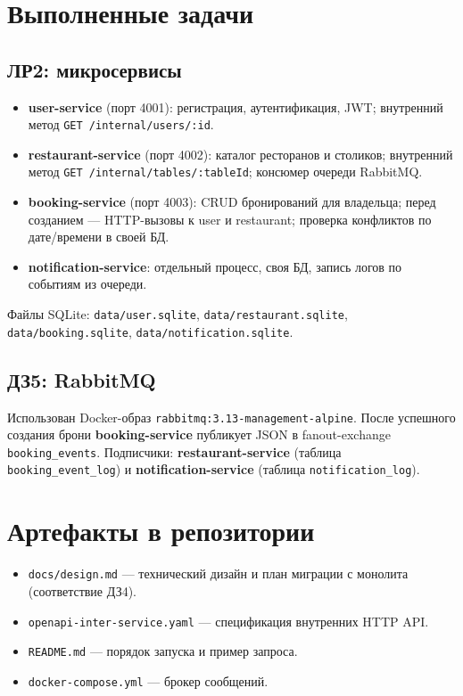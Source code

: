 \documentclass[a4paper,14pt]{extarticle}
\begin{document}
\section{Выполненные задачи}

\subsection{ЛР2: микросервисы}

\begin{itemize}
  \item \textbf{user-service} (порт 4001): регистрация, аутентификация, JWT; внутренний метод \texttt{GET /internal/users/:id}.
  \item \textbf{restaurant-service} (порт 4002): каталог ресторанов и столиков; внутренний метод \texttt{GET /internal/tables/:tableId}; консюмер очереди RabbitMQ.
  \item \textbf{booking-service} (порт 4003): CRUD бронирований для владельца; перед созданием --- HTTP-вызовы к user и restaurant; проверка конфликтов по дате/времени в своей БД.
  \item \textbf{notification-service}: отдельный процесс, своя БД, запись логов по событиям из очереди.
\end{itemize}

Файлы SQLite: \texttt{data/user.sqlite}, \texttt{data/restaurant.sqlite}, \texttt{data/booking.sqlite}, \texttt{data/notification.sqlite}.

\subsection{ДЗ5: RabbitMQ}

Использован Docker-образ \texttt{rabbitmq:3.13-management-alpine}. После успешного создания брони \textbf{booking-service} публикует JSON в fanout-exchange \texttt{booking_events}. Подписчики: \textbf{restaurant-service} (таблица \texttt{booking_event_log}) и \textbf{notification-service} (таблица \texttt{notification_log}).

\section{Артефакты в репозитории}

\begin{itemize}
  \item \texttt{docs/design.md} --- технический дизайн и план миграции с монолита (соответствие ДЗ4).
  \item \texttt{openapi-inter-service.yaml} --- спецификация внутренних HTTP API.
  \item \texttt{README.md} --- порядок запуска и пример запроса.
  \item \texttt{docker-compose.yml} --- брокер сообщений.
\end{itemize}
\end{document}
